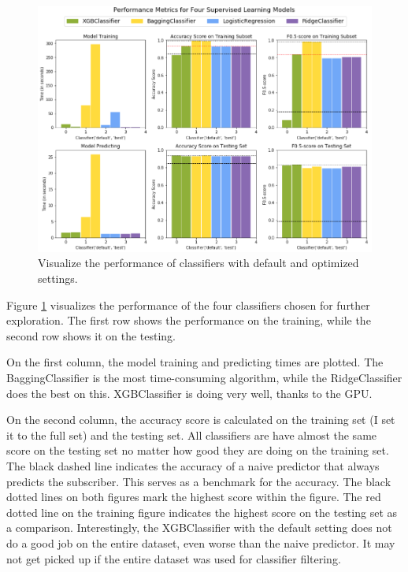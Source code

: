 \documentclass[a4paper]{article}
\begin{document}
			\begin{figure}
				\centering
				\includegraphics[width=1\textwidth]{ClassifiersPerformance.png}\caption{\label{fig:classifiers_performance}Visualize the performance of classifiers with default and optimized settings.}	
			\end{figure}	
			
			Figure \ref{fig:classifiers_performance} visualizes the performance of the four classifiers chosen for further exploration. The first row shows the performance on the training, while the second row shows it on the testing. 
			
			On the first column, the model training and predicting times are plotted. The BaggingClassifier is the most time-consuming algorithm, while the RidgeClassifier does the best on this. XGBClassifier is doing very well, thanks to the GPU.
			
			On the second column, the accuracy score is calculated on the training set (I set it to the full set) and the testing set. All classifiers are have almost the same score on the testing set no matter how good they are doing on the training set. The black dashed line indicates the accuracy of a naive predictor that always predicts the subscriber. This serves as a benchmark for the accuracy. The black dotted lines on both figures mark the highest score within the figure. The red dotted line on the training figure indicates the highest score on the testing set as a comparison. Interestingly, the XGBClassifier with the default setting does not do a good job on the entire dataset, even worse than the naive predictor. It may not get picked up if the entire dataset was used for classifier filtering.
			
\end{document}
